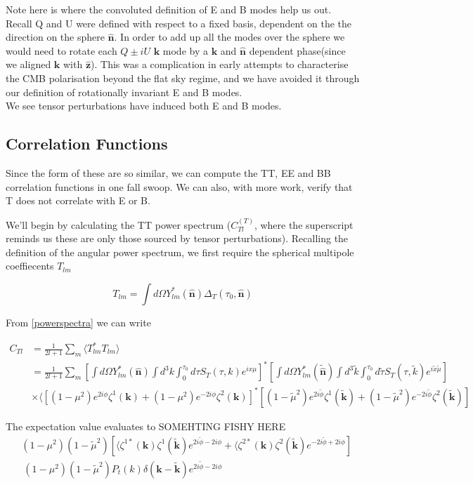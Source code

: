 \documentclass[a4paper,11pt]{article}
\renewcommand{\v}[1]{\mathbf{#1}}
\newcommand{\unit}[1]{\hat{\v{#1}}}
\begin{document}
Note here is where the convoluted definition of E and B modes help us out. Recall Q and U were defined with respect to a fixed basis, dependent on the the direction on the sphere $\unit{n}$. In order to add up all the modes over the sphere we would need to rotate each $Q\pm iU$ $\v{k}$ mode by a $\v{k}$ and $\unit{n}$ dependent phase(since we aligned $\v{k}$ with $\unit{z}$). This was a complication in early attempts to characterise the CMB polarisation beyond the flat sky regime, and we have avoided it through our definition of rotationally invariant E and B modes.\\

We see tensor perturbations have induced both E and B modes.

\subsection{Correlation Functions}

Since the form of these are so similar, we can compute the TT, EE and BB correlation functions in one fall swoop. We can also, with more work, verify that T does not correlate with E or B.

We'll begin by calculating the TT power spectrum ($C_{Tl}^{(T)}$, where the superscript reminds us these are only those sourced by tensor perturbations). Recalling the definition of the angular power spectrum, we first require the spherical multipole coeffiecents $T_{lm}$  

\begin{equation}
T_{lm} = \int d\Omega Y_{lm}^*(\unit{n})\Delta_T(\tau_0,\unit{n})
\end{equation}

From \ref{powerspectra} we can write 

\begin{align}
C_{Tl} &= \frac{1}{2l+1}\sum_m \langle T_{lm}^*T_{lm} \rangle \\
&= \frac{1}{2l+1} \sum_m [\int d\Omega Y_{lm}^*(\unit{n})\int d^3k\int_0^{\tau_0}d\tau S_T(\tau,k)e^{ix\mu}]^*
[\int d\Omega Y_{lm}^*(\tilde{\unit{n}})\int d^3\tilde{k}\int_0^{\tau_0}d\tilde{\tau}S_T(\tau,\tilde{k})e^{i\tilde{x}\tilde{\mu}}]\\
&\times
\langle [(1-\mu^2) e^{2i\phi} \zeta^1(\v{k})+(1-\mu^2) e^{-2i\phi} \zeta^2(\v{k})]^*[(1-\tilde{\mu}^2) e^{2i\tilde{\phi}} \zeta^1(\v{\tilde{k}})+(1-\tilde{\mu}^2) e^{-2i\tilde{\phi}} \zeta^2(\v{\tilde{k}})]
\end{align}

The expectation value evaluates to
SOMEHTING FISHY HERE
\begin{align}
&(1-\mu^2)(1-\tilde{\mu}^2)[\langle\zeta^{1*}(\v{k})\zeta^1(\v{\tilde{k}})e^{2i\tilde{\phi}-2i\phi}+\langle\zeta^{2*}(\v{k})\zeta^2(\v{\tilde{k}})e^{-2i\tilde{\phi}+2i\phi}]\\
&~ (1-\mu^2)(1-\tilde{\mu}^2)P_t(k)\delta(\v{k}-\v{\tilde{k}})e^{2i\tilde{\phi}-2i\phi}
\end{align}
\end{document}
